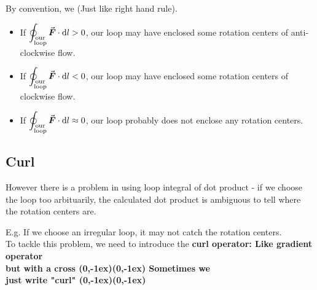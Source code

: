 \documentclass[class=article, crop=false, 12pt]{standalone}
\begin{document}
By convention, we  (Just like right hand rule). 
\begin{itemize}
    \item If $\displaystyle \oint_{\substack{\text{our}\\\text{loop}}} \va*{F}\cdot \dd{l} > 0$,
    our loop may have enclosed some rotation centers of anti-clockwise flow.



    \item If $\displaystyle \oint_{\substack{\text{our}\\\text{loop}}} \va*{F}\cdot \dd{l} < 0$,
    our loop may have enclosed some rotation centers of clockwise flow.



    \item If $\displaystyle \oint_{\substack{\text{our}\\\text{loop}}} \va*{F}\cdot \dd{l} \approx 0$,
    our loop probably does not enclose any rotation centers.


\end{itemize}



\subsection{Curl}

However there is a problem in using loop integral of dot product - 
if we choose the loop too arbituarily, 
the calculated dot product is ambiguous to tell where the rotation centers are.


E.g. If we choose an irregular loop, it may not catch the rotation centers.\\

To tackle this problem,
we need to introduce the \bf{curl} operator:
{\scriptsize Like gradient operator\\[-1ex]\scriptsize but with a cross}
{(0,-1ex)}{(0,-1ex)}
{\scriptsize Sometimes we\\[-1ex]\scriptsize just write "curl"}
{(0,-1ex)}{(0,-1ex)}
\end{document}
